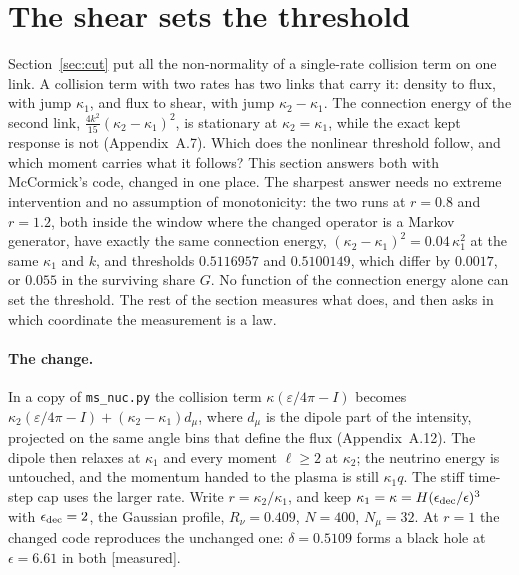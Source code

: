 \documentclass[11pt]{article}
\newcommand{\grade}[1]{\textsf{\small[#1]}}
\begin{document}
\section{The shear sets the threshold}\label{sec:link}

Section~\ref{sec:cut} put all the non-normality of a single-rate collision term on one link. A collision term with two rates has two links that carry it: density to flux, with jump $\kappa_1$, and flux to shear, with jump $\kappa_2-\kappa_1$. The connection energy of the second link, $\tfrac{4k^2}{15}(\kappa_2-\kappa_1)^2$, is stationary at $\kappa_2=\kappa_1$, while the exact kept response is not (Appendix~A.7). Which does the nonlinear threshold follow, and which moment carries what it follows? This section answers both with McCormick's code, changed in one place. The sharpest answer needs no extreme intervention and no assumption of monotonicity: the two runs at $r=0.8$ and $r=1.2$, both inside the window where the changed operator is a Markov generator, have exactly the same connection energy, $(\kappa_2-\kappa_1)^2=0.04\,\kappa_1^2$ at the same $\kappa_1$ and $k$, and thresholds $0.5116957$ and $0.5100149$, which differ by $0.0017$, or $0.055$ in the surviving share $G$. No function of the connection energy alone can set the threshold. The rest of the section measures what does, and then asks in which coordinate the measurement is a law.

\paragraph{The change.} In a copy of \texttt{ms\_nuc.py} the collision term $\kappa(\varepsilon/4\pi-I)$ becomes $\kappa_2(\varepsilon/4\pi-I)+(\kappa_2-\kappa_1)d_\mu$, where $d_\mu$ is the dipole part of the intensity, projected on the same angle bins that define the flux (Appendix~A.12). The dipole then relaxes at $\kappa_1$ and every moment $\ell\ge2$ at $\kappa_2$; the neutrino energy is untouched, and the momentum handed to the plasma is still $\kappa_1q$. The stiff time-step cap uses the larger rate. Write $r=\kappa_2/\kappa_1$, and keep $\kappa_1=\kappa=H(\epsilon_{\rm dec}/\epsilon)^3$ with $\epsilon_{\rm dec}=2$, the Gaussian profile, $R_\nu=0.409$, $N=400$, $N_\mu=32$. At $r=1$ the changed code reproduces the unchanged one: $\delta=0.5109$ forms a black hole at $\epsilon=6.61$ in both \grade{measured}.
\end{document}
